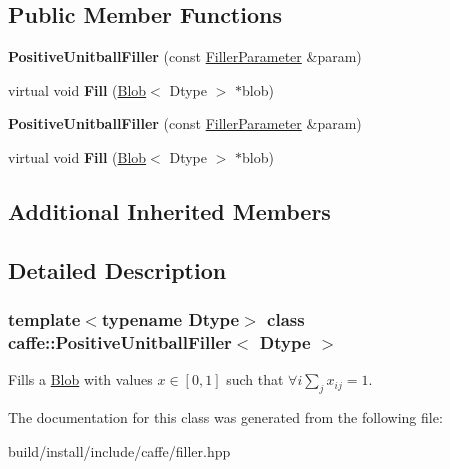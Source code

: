 \subsection*{Public Member Functions}
\begin{DoxyCompactItemize}
\item 
\mbox{\label{classcaffe_1_1_positive_unitball_filler_acbd0bc19718baa6e2557528e6cf16151}} 
{\bfseries Positive\+Unitball\+Filler} (const \mbox{\hyperlink{classcaffe_1_1_filler_parameter}{Filler\+Parameter}} \&param)
\item 
\mbox{\label{classcaffe_1_1_positive_unitball_filler_a8ace4f586a5aa3eab7de1dd796556f42}} 
virtual void {\bfseries Fill} (\mbox{\hyperlink{classcaffe_1_1_blob}{Blob}}$<$ Dtype $>$ $\ast$blob)
\item 
\mbox{\label{classcaffe_1_1_positive_unitball_filler_acbd0bc19718baa6e2557528e6cf16151}} 
{\bfseries Positive\+Unitball\+Filler} (const \mbox{\hyperlink{classcaffe_1_1_filler_parameter}{Filler\+Parameter}} \&param)
\item 
\mbox{\label{classcaffe_1_1_positive_unitball_filler_a8ace4f586a5aa3eab7de1dd796556f42}} 
virtual void {\bfseries Fill} (\mbox{\hyperlink{classcaffe_1_1_blob}{Blob}}$<$ Dtype $>$ $\ast$blob)
\end{DoxyCompactItemize}
\subsection*{Additional Inherited Members}


\subsection{Detailed Description}
\subsubsection*{template$<$typename Dtype$>$\newline
class caffe\+::\+Positive\+Unitball\+Filler$<$ Dtype $>$}

Fills a \mbox{\hyperlink{classcaffe_1_1_blob}{Blob}} with values $ x \in [0, 1] $ such that $ \forall i \sum_j x_{ij} = 1 $. 

The documentation for this class was generated from the following file\+:\begin{DoxyCompactItemize}
\item 
build/install/include/caffe/filler.\+hpp\end{DoxyCompactItemize}
